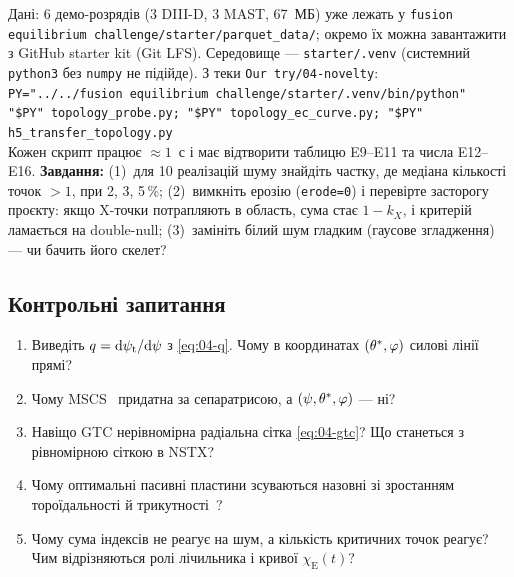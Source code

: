 \begin{practicum}
Дані: 6 демо-розрядів (3 DIII-D, 3 MAST, 67~МБ) уже лежать у \texttt{fusion equilibrium challenge/starter/parquet\_data/}; окремо їх можна завантажити з GitHub starter kit (Git LFS). Середовище --- \texttt{starter/.venv} (системний \texttt{python3} без \texttt{numpy} не підійде). З теки \texttt{Our try/04-novelty}:\\
\texttt{PY="../../fusion equilibrium challenge/starter/.venv/bin/python"}\\
\texttt{"\$PY" topology\_probe.py; "\$PY" topology\_ec\_curve.py; "\$PY" h5\_transfer\_topology.py}\\
Кожен скрипт працює $\approx1$~с і має відтворити таблицю E9--E11 та числа E12--E16. \textbf{Завдання:} (1)~для 10 реалізацій шуму знайдіть частку, де медіана кількості точок $>1$, при 2, 3, 5\,\%; (2)~вимкніть ерозію (\texttt{erode=0}) і перевірте засторогу проєкту: якщо X-точки потрапляють в область, сума стає $1-k_X$, і критерій ламається на double-null; (3)~замініть білий шум гладким (гаусове згладження) --- чи бачить його скелет?
\end{practicum}

\subsection*{Контрольні запитання}
\begin{enumerate}
\item Виведіть $q=\mathrm{d}\psi_{\mathrm{t}}/\mathrm{d}\psi$ з \eqref{eq:04-q}. Чому в координатах $(\theta^{*},\varphi)$ силові лінії прямі?
\item Чому MSCS~\cite{Seto2014} придатна за сепаратрисою, а $(\psi,\theta^{*},\varphi)$ --- ні?
\item Навіщо GTC нерівномірна радіальна сітка \eqref{eq:04-gtc}? Що станеться з рівномірною сіткою в NSTX?
\item Чому оптимальні пасивні пластини зсуваються назовні зі зростанням тороїдальності й трикутності~\cite{Ward1992}?
\item Чому сума індексів не реагує на шум, а кількість критичних точок реагує? Чим відрізняються ролі лічильника і кривої $\chi_{\mathrm{E}}(t)$?
\end{enumerate}

